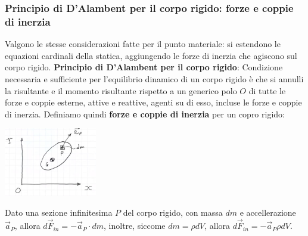 \subsubsection{Principio di D'Alambent per il corpo rigido: forze e coppie di inerzia}
Valgono le stesse considerazioni fatte per il punto materiale: si estendono le equazioni cardinali della statica, aggiungendo le forze di inerzia che agiscono sul corpo rigido.\newline
\newline
\textbf{Principio di D'Alambent per il corpo rigido}:\newline
Condizione necessaria e sufficiente per l'equilibrio dinamico di un corpo rigido è che si annulli la risultante e il momento risultante rispetto a un generico polo $O$ di tutte le forze e coppie esterne, attive e reattive, agenti su di esso, incluse le forze e coppie di inerzia.\newline
\newline
Definiamo quindi \textbf{forze e coppie di inerzia} per un copro rigido:
\begin{center}
    \includegraphics[height=3cm]{../lezione9/img1.JPG}
\end{center}
Dato una sezione infinitesima $P$ del corpo rigido, con massa $dm$ e accellerazione $\vec{a}_P$, allora $d \vec{F}_{in} = - \vec{a}_P \cdot dm$, inoltre, siccome $dm = \rho dV$, allora $d \vec{F}_{in} = - \vec{a}_P \rho dV$.
